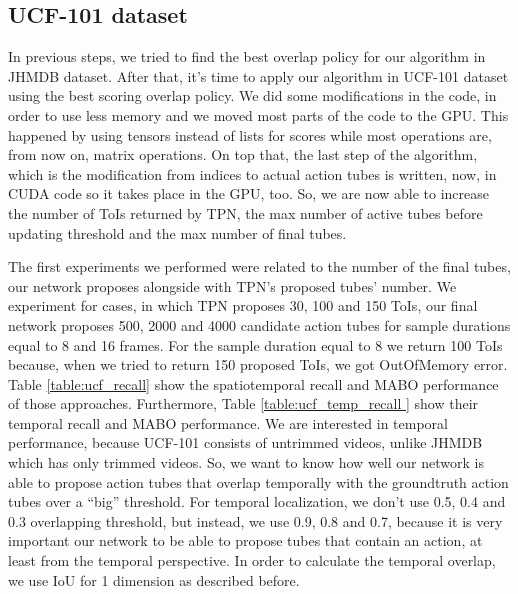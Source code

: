 \subsection{UCF-101 dataset}
In previous steps, we tried to find the best overlap policy for our algorithm in JHMDB dataset. After that, it's time to apply our algorithm in UCF-101 dataset using the best scoring
overlap policy. We did some modifications in the code, in order to use less memory and we moved most parts of the code to the GPU. This happened by using tensors instead of lists for scores while
most operations are, from now on, matrix operations. On top that, the last step of the algorithm, which is the modification from indices to actual action tubes is written, now, in CUDA code so
it takes place in the GPU, too. So, we are now able to increase the number of ToIs returned by TPN, the max number of active tubes before updating threshold and the max number of final
tubes. \par
The first experiments we performed were related to the number of the final tubes, our network proposes alongside with TPN's proposed
tubes' number. We experiment for cases, in which TPN proposes 30, 100 and 150 ToIs, our final network proposes 500, 2000 and 4000
candidate action tubes for sample durations equal to 8 and 16 frames.
For the sample duration equal to 8 we return 100 ToIs because, when we tried to return 150 proposed ToIs, we got OutOfMemory error.
Table \ref{table:ucf_recall} show the spatiotemporal recall and MABO performance of those approaches. Furthermore, Table \ref{table:ucf_temp_recall } show their temporal recall and MABO performance. We are interested in temporal performance, because UCF-101 consists of
untrimmed videos, unlike JHMDB which has only trimmed videos. So, we want to know how well our network is able to propose action tubes that
overlap temporally with the groundtruth action tubes over a ``big'' threshold. For temporal localization, we don't use 0.5, 0.4 and 0.3
overlapping threshold, but instead, we use 0.9, 0.8 and 0.7, because it is very important our network to be able to propose tubes that
 contain an action, at least from the temporal perspective. In order to calculate the temporal overlap, we use IoU for 1 dimension as described before.

